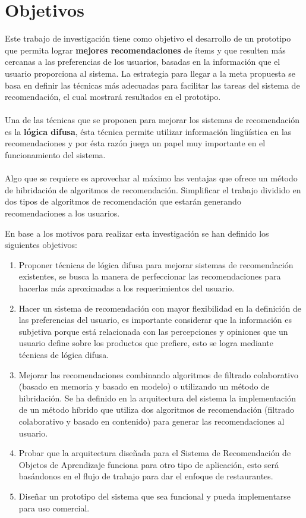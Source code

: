 \documentclass[12pt,letterpaper,oneside] {memoir}
\begin{document}
\section{Objetivos}

Este trabajo de investigación tiene como objetivo el desarrollo de un prototipo que permita lograr \textbf{mejores recomendaciones} de ítems y que resulten más cercanas a las preferencias de los usuarios, basadas en la información que el usuario proporciona al sistema. La estrategia para llegar a la meta propuesta se basa en definir las técnicas más adecuadas para facilitar las tareas del sistema de recomendación, el cual mostrará resultados en el prototipo.
\paragraph{}
Una de las técnicas que se proponen para mejorar los sistemas de recomendación es la \textbf{lógica difusa}, ésta técnica permite utilizar información lingüística en las recomendaciones  y por ésta razón juega un papel muy importante en el funcionamiento del sistema.
\paragraph{}
Algo que se requiere es aprovechar al máximo las ventajas que ofrece un método de hibridación de algoritmos de recomendación. Simplificar el trabajo dividido en dos tipos de algoritmos de recomendación que estarán generando recomendaciones a los usuarios.

En base a los motivos para realizar esta investigación se han definido los siguientes objetivos:
\begin{enumerate}
\item Proponer técnicas de lógica difusa para mejorar sistemas de recomendación existentes, se busca la manera de perfeccionar las recomendaciones para hacerlas más aproximadas a los requerimientos del usuario.
\item Hacer un sistema de recomendación con mayor flexibilidad en la definición de las preferencias del usuario, es importante considerar que la información es subjetiva porque está relacionada con las percepciones y opiniones que un usuario define sobre los productos que prefiere, esto se logra mediante técnicas de lógica difusa.
\item Mejorar las recomendaciones combinando algoritmos de filtrado colaborativo (basado en memoria y basado en modelo) o utilizando un método de hibridación. Se ha definido en la arquitectura del sistema la implementación de un método híbrido que utiliza dos  algoritmos de recomendación (filtrado colaborativo y basado en contenido) para generar las recomendaciones al usuario.
\item Probar que la arquitectura diseñada para el Sistema de Recomendación de Objetos de Aprendizaje \citep{Garcia2009} funciona para otro tipo de aplicación, esto será basándonos en el flujo de trabajo para dar el enfoque de restaurantes.
\item  Diseñar un prototipo del sistema que sea funcional y pueda implementarse para uso comercial.
\end{enumerate}
\end{document}
